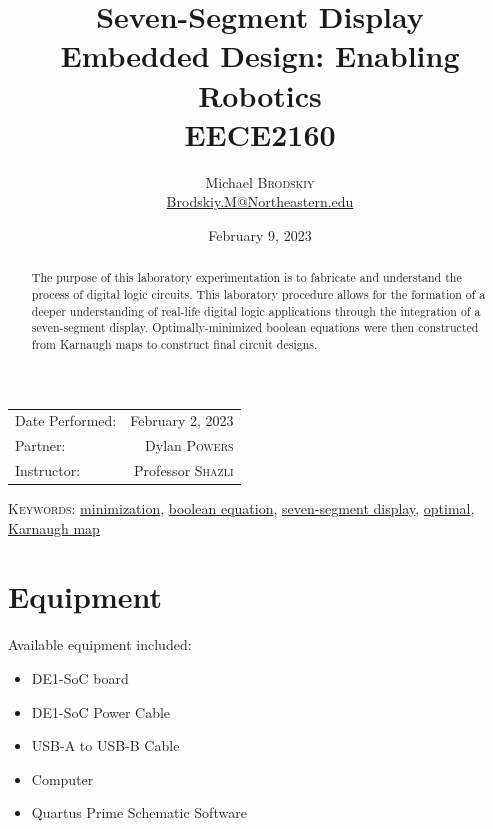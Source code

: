 \documentclass[
	letterpaper, %
	10pt, %
]{CSUniSchoolLabReport}
\title{Seven-Segment Display \\ Embedded Design: Enabling Robotics \\ EECE2160} %
\author{Michael \textsc{Brodskiy}\\ \small \href{mailto:Brodskiy.M@Northeastern.edu}{Brodskiy.M@Northeastern.edu}}
\date{February 9, 2023} %
\begin{document}
\maketitle %

\begin{center}
	\begin{tabular}{l r}
		Date Performed: & February 2, 2023 \\ %
        Partner: & Dylan \textsc{Powers} \\ %
		Instructor: & Professor \textsc{Shazli} %
	\end{tabular}
\end{center}

\newpage

\begin{abstract}

  The purpose of this laboratory experimentation is to fabricate and understand the process of digital logic circuits. This laboratory procedure allows for the formation of a deeper understanding of real-life digital logic applications through the integration of a seven-segment display. Optimally-minimized boolean equations were then constructed from Karnaugh maps to construct final circuit designs.

\end{abstract}

\begin{flushleft}

  \textsc{Keywords:} \underline{minimization}, \underline{boolean equation}, \underline{seven-segment display}, \underline{optimal}, \underline{Karnaugh map}

\end{flushleft}

\newpage

\section{Equipment}

\hspace{.5 in} Available equipment included:\\

\begin{itemize}

  \item DE1-SoC board

  \item DE1-SoC Power Cable

  \item USB-A to USB-B Cable

  \item Computer

  \item Quartus Prime Schematic Software

\end{itemize}
\end{document}
